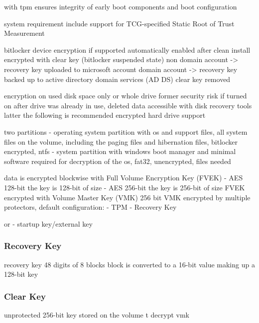 with tpm ensures integrity of early boot components and boot configuration


system requirement
include support for TCG-specified Static Root of Trust Measurement

bitlocker device encryption if supported automatically enabled
after clean install encrypted with clear key (bitlocker suspended state)
non domain account -> recovery key uploaded to microsoft account
domain account -> recovery key backed up to active directory domain services (AD DS)
clear key removed

encryption on used disk space only or whole drive
former security risk if turned on after drive was already in use, deleted data accessible with disk recovery tools
latter the following is recommended
encrypted hard drive support

two partitions
- operating system partition with os and support files, all system files on the volume, including the paging files and hibernation files, bitlocker encrypted, ntfs
- system partition with windows boot manager and minimal software required for decryption of the os, fat32, unencrypted, files needed

data is encrypted blockwise with Full Volume Encryption Key (FVEK)
- AES 128-bit the key is 128-bit of size
- AES 256-bit the key is 256-bit of size
FVEK encrypted with Volume Master Key (VMK) 256 bit
VMK encrypted by multiple protectors, default configuration:
- TPM
- Recovery Key

or
- startup key/external key

\subsubsection{Recovery Key}
recovery key 48 digits of 8 blocks
block is converted to a 16-bit value making up a 128-bit key

\subsubsection{Clear Key}
unprotected 256-bit key stored on the volume t decrypt vmk

